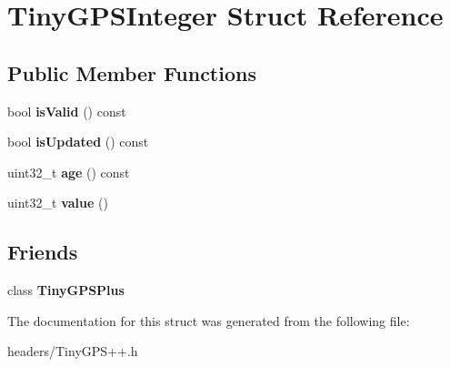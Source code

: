 \hypertarget{struct_tiny_g_p_s_integer}{}\section{Tiny\+G\+P\+S\+Integer Struct Reference}
\label{struct_tiny_g_p_s_integer}
\subsection*{Public Member Functions}
\begin{DoxyCompactItemize}
\item 
bool {\bfseries is\+Valid} () const \hypertarget{struct_tiny_g_p_s_integer_aad411b5eb6cc16774ff0ff8d275df2fa}{}\label{struct_tiny_g_p_s_integer_aad411b5eb6cc16774ff0ff8d275df2fa}

\item 
bool {\bfseries is\+Updated} () const \hypertarget{struct_tiny_g_p_s_integer_aa6479670272df580287f84938183dc20}{}\label{struct_tiny_g_p_s_integer_aa6479670272df580287f84938183dc20}

\item 
uint32\+\_\+t {\bfseries age} () const \hypertarget{struct_tiny_g_p_s_integer_a46ea8f4fe8cca279b7d4cd44572e5881}{}\label{struct_tiny_g_p_s_integer_a46ea8f4fe8cca279b7d4cd44572e5881}

\item 
uint32\+\_\+t {\bfseries value} ()\hypertarget{struct_tiny_g_p_s_integer_a67de7e76d61dbd25eb32f701d8ce867b}{}\label{struct_tiny_g_p_s_integer_a67de7e76d61dbd25eb32f701d8ce867b}

\end{DoxyCompactItemize}
\subsection*{Friends}
\begin{DoxyCompactItemize}
\item 
class {\bfseries Tiny\+G\+P\+S\+Plus}\hypertarget{struct_tiny_g_p_s_integer_a6501fd5ef19ae166d43e0e5781609ee2}{}\label{struct_tiny_g_p_s_integer_a6501fd5ef19ae166d43e0e5781609ee2}

\end{DoxyCompactItemize}


The documentation for this struct was generated from the following file\+:\begin{DoxyCompactItemize}
\item 
headers/Tiny\+G\+P\+S++.\+h\end{DoxyCompactItemize}
